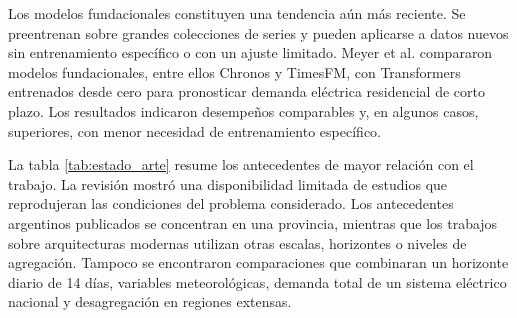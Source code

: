 Los modelos fundacionales constituyen una tendencia aún más reciente. Se preentrenan sobre grandes colecciones de series y pueden aplicarse a datos nuevos sin entrenamiento específico o con un ajuste limitado. Meyer et al. \cite{meyer2025foundationload} compararon modelos fundacionales, entre ellos Chronos y TimesFM, con Transformers entrenados desde cero para pronosticar demanda eléctrica residencial de corto plazo. Los resultados indicaron desempeños comparables y, en algunos casos, superiores, con menor necesidad de entrenamiento específico.

La tabla \ref{tab:estado_arte} resume los antecedentes de mayor relación con el trabajo. La revisión mostró una disponibilidad limitada de estudios que reprodujeran las condiciones del problema considerado. Los antecedentes argentinos publicados se concentran en una provincia, mientras que los trabajos sobre arquitecturas modernas utilizan otras escalas, horizontes o niveles de agregación. Tampoco se encontraron comparaciones que combinaran un horizonte diario de 14 días, variables meteorológicas, demanda total de un sistema eléctrico nacional y desagregación en regiones extensas.

